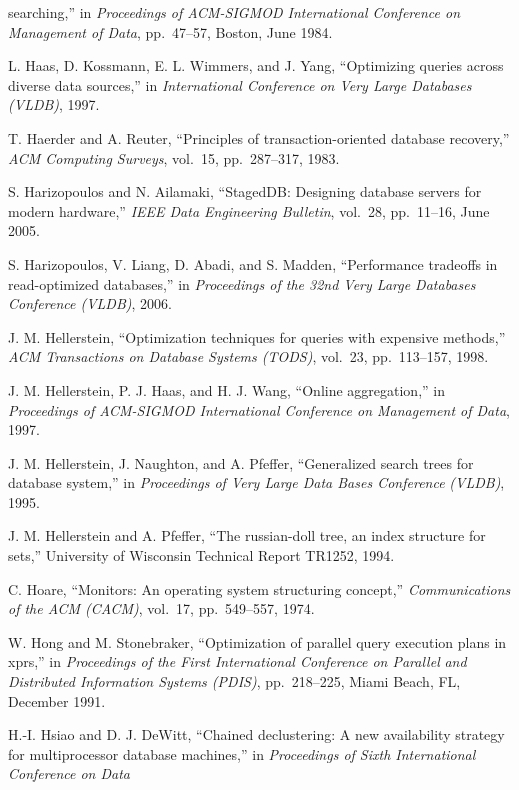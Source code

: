 \documentclass[a4paper,11pt,twoside,openright]{book}
\begin{document}
\begin{enumerate}[label={[\arabic*]}]
  searching,'' in \emph{Proceedings of ACM-SIGMOD International
  Conference on Management of Data}, pp.~47--57, Boston, June 1984.
\item
  L. Haas, D. Kossmann, E. L. Wimmers, and J. Yang, ``Optimizing queries
  across diverse data sources,'' in \emph{International Conference on
  Very Large Databases} \emph{(VLDB)}, 1997.
\item
  T. Haerder and A. Reuter, ``Principles of transaction-oriented
  database recovery,'' \emph{ACM Computing Surveys}, vol.~15,
  pp.~287--317, 1983.
\item
  S. Harizopoulos and N. Ailamaki, ``StagedDB: Designing database
  servers for modern hardware,'' \emph{IEEE Data Engineering Bulletin},
  vol.~28, pp.~11--16, June 2005.
\item
  S. Harizopoulos, V. Liang, D. Abadi, and S. Madden, ``Performance
  tradeoffs in read-optimized databases,'' in \emph{Proceedings of the
  32nd Very Large Databases} \emph{Conference (VLDB)}, 2006.
\item
  J. M. Hellerstein, ``Optimization techniques for queries with
  expensive methods,'' \emph{ACM Transactions on Database Systems
  (TODS)}, vol.~23, pp.~113--157, 1998.
\item
  J. M. Hellerstein, P. J. Haas, and H. J. Wang, ``Online aggregation,''
  in \emph{Proceedings of ACM-SIGMOD International Conference on
  Management of Data}, 1997.
\item
  J. M. Hellerstein, J. Naughton, and A. Pfeffer, ``Generalized search
  trees for database system,'' in \emph{Proceedings of Very Large Data
  Bases Conference} \emph{(VLDB)}, 1995.
\item
  J. M. Hellerstein and A. Pfeffer, ``The russian-doll tree, an index
  structure for sets,'' University of Wisconsin Technical Report TR1252,
  1994.
\item
  C. Hoare, ``Monitors: An operating system structuring concept,''
  \emph{Communications of the ACM (CACM)}, vol.~17, pp.~549--557, 1974.
\item
  W. Hong and M. Stonebraker, ``Optimization of parallel query execution
  plans in xprs,'' in \emph{Proceedings of the First International
  Conference on Parallel} \emph{and Distributed Information Systems
  (PDIS)}, pp.~218--225, Miami Beach, FL, December 1991.
\item
  H.-I. Hsiao and D. J. DeWitt, ``Chained declustering: A new
  availability strategy for multiprocessor database machines,'' in
  \emph{Proceedings of Sixth International Conference on Data
}
\end{enumerate}
\end{document}
